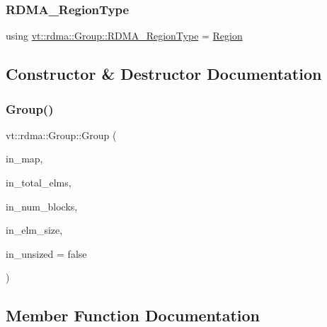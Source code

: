 \subsubsection{\texorpdfstring{R\+D\+M\+A\+\_\+\+Region\+Type}{RDMA\_RegionType}}
{\footnotesize\ttfamily using \hyperlink{structvt_1_1rdma_1_1_group_a245644a7a0c40c547728a74e69c5e02f}{vt\+::rdma\+::\+Group\+::\+R\+D\+M\+A\+\_\+\+Region\+Type} =  \hyperlink{structvt_1_1rdma_1_1_region}{Region}}



\subsection{Constructor \& Destructor Documentation}
\mbox{\label{structvt_1_1rdma_1_1_group_a2e4d5e75abc385ed0769de042b070d66}} 
\subsubsection{\texorpdfstring{Group()}{Group()}}
{\footnotesize\ttfamily vt\+::rdma\+::\+Group\+::\+Group (\begin{DoxyParamCaption}\item[{\hyperlink{structvt_1_1rdma_1_1_group_a6a953be1b6d9907d49364a9a202d3379}{R\+D\+M\+A\+\_\+\+Map\+Type} const \&}]{in\+\_\+map,  }\item[{\hyperlink{namespacevt_a2c2a902092b72056f70210c159f966f0}{R\+D\+M\+A\+\_\+\+Elm\+Type} const \&}]{in\+\_\+total\+\_\+elms,  }\item[{\hyperlink{namespacevt_ae54d2ca8f6bb4d65faf65118c82cd6f7}{R\+D\+M\+A\+\_\+\+Block\+Type} const \&}]{in\+\_\+num\+\_\+blocks,  }\item[{\hyperlink{namespacevt_aab8d55968084610ce3b17057981e9300}{Byte\+Type} const \&}]{in\+\_\+elm\+\_\+size,  }\item[{bool const \&}]{in\+\_\+unsized = {\ttfamily false} }\end{DoxyParamCaption})\hspace{0.3cm}{\ttfamily [inline]}}



\subsection{Member Function Documentation}
\mbox{\label{structvt_1_1rdma_1_1_group_aae5cb279219369b78d1c2f6d6b96fb56}} 
